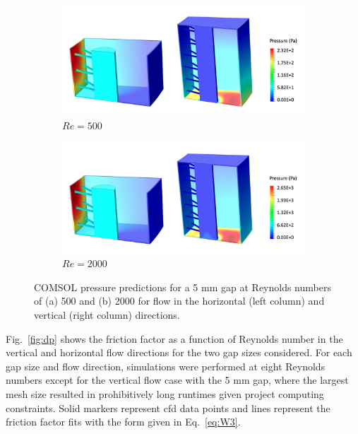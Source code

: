 \begin{figure}[!htb]
\centering
\begin{subfigure}{\textwidth}
  \centering
  \includegraphics[width=0.8\linewidth]{figs/Re500_cm1_p.png}
  \caption{\(Re=500\)}
\end{subfigure}
\begin{subfigure}{\textwidth}
  \centering
  \includegraphics[width=0.8\linewidth]{figs/Re2000_cm1_p.png}
  \caption{\(Re=2000\)}
\end{subfigure}
\caption{COMSOL pressure predictions for a 5 \si{\milli\meter} gap at Reynolds numbers of (a) 500 and (b) 2000 for flow in the horizontal (left column) and vertical (right column) directions.}
\label{fig:pressure_10}
\end{figure}

Fig.\ \ref{fig:dp} shows the friction factor as a function of Reynolds number in the vertical and horizontal flow directions for the two gap sizes considered. For each gap size and flow direction, simulations were performed at eight Reynolds numbers except for the vertical flow case with the 5 \si{\milli\meter} gap, where the largest mesh size resulted in prohibitively long runtimes given project computing constraints. Solid markers represent \gls{cfd} data points and lines represent the friction factor fits with the form given in Eq.\ \eqref{eq:W3}. 

